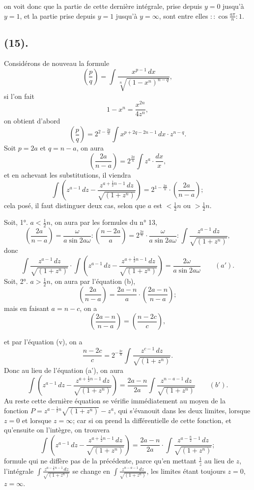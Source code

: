 \documentclass{article}
\begin{document}
on voit donc que la partie de cette dernière intégrale, prise depuis $y=0$ jusqu'à $y=1$, et la partie prise depuis $y=1$ jusqu'à $y=\infty$, sont entre elles $::\cos\frac{a\pi}{n}:1$.

\subsection*{(15).}

Considérons de nouveau la formule
\[ \left(\frac{p}{q}\right)=\int\frac{x^{p-1}\,dx}{\sqrt[n]{(1-x^{n})^{n-q}}}, \]
si l'on fait
\[ 1-x^{n}=\frac{x^{2n}}{4z^{n}}, \]
on obtient d'abord
\[ \left(\frac{p}{q}\right)=2^{2-\frac{2q}{n}}\int x^{p+2q-2n-1}\,dx\cdot z^{n-q}. \]
Soit $p=2a$ et $q=n-a$, on aura
\[ \left(\frac{2a}{n-a}\right)=2^{\frac{2a}{n}}\int z^{a}\cdot\frac{dx}{x}, \]
et en achevant les substitutions, il viendra
\[ \int\left(z^{a-1}\,dz-\frac{z^{a+\frac{1}{2}n-1}\,dz}{\sqrt{(1+z^{n})}}\right)=2^{1-\frac{2a}{n}}\cdot\left(\frac{2a}{n-a}\right); \]
cela posé, il faut distinguer deux cas, selon que $a$ est $<\frac{1}{2}n$ ou $>\frac{1}{2}n$.

Soit, 1°. $a<\frac{1}{2}n$, on aura par les formules du n° 13,
\[ \left(\frac{2a}{n-a}\right)=\frac{\omega}{a\sin 2a\omega}:\left(\frac{n-2a}{a}\right)=2^{\frac{2a}{n}}\cdot\frac{\omega}{a\sin 2a\omega}:\int\frac{z^{a-1}\,dz}{\sqrt{(1+z^{n})}}, \]
donc
\[ \int\frac{z^{a-1}\,dz}{\sqrt{(1+z^{n})}}\cdot\int\left(z^{a-1}\,dz-\frac{z^{a+\frac{1}{2}n-1}\,dz}{\sqrt{(1+z^{n})}}\right)=\frac{2\omega}{a\sin 2a\omega}\qquad(a'). \]
Soit, 2°. $a>\frac{1}{2}n$, on aura par l'équation (b),
\[ \left(\frac{2a}{n-a}\right)=\frac{2a-n}{a}\cdot\left(\frac{2a-n}{n-a}\right); \]
mais en faisant $a=n-c$, on a
\[ \left(\frac{2a-n}{n-a}\right)=\left(\frac{n-2c}{c}\right), \]

et par l'équation (v), on a
\[ \frac{n-2c}{c}=2^{-\frac{2c}{n}}\int\frac{z^{c-1}\,dz}{\sqrt{(1+z^{n})}}. \]
Donc au lieu de l'équation (a'), on aura
\[ \int\left(z^{a-1}\,dz-\frac{z^{a+\frac{1}{2}n-1}\,dz}{\sqrt{(1+z^{n})}}\right)=\frac{2a-n}{2a}\int\frac{z^{n-a-1}\,dz}{\sqrt{(1+z^{n})}}\qquad(b'). \]
Au reste cette dernière équation se vérifie immédiatement au moyen de la fonction $P=z^{a-\frac{1}{2}n}\sqrt{(1+z^{n})}-z^{a}$, qui s'évanouit dans les deux limites, lorsque $z=0$ et lorsque $z=\infty$; car si on prend la différentielle de cette fonction, et qu'ensuite on l'intègre, on trouvera
\[ \int\left(z^{a-1}\,dz-\frac{z^{a+\frac{1}{2}n-1}\,dz}{\sqrt{(1+z^{n})}}\right)=\frac{2a-n}{2a}\cdot\int\frac{z^{a-\frac{n}{2}-1}\,dz}{\sqrt{(1+z^{n})}}; \]
formule qui ne diffère pas de la précédente, parce qu'en mettant $\frac{1}{z}$ au lieu de $z$, l'intégrale $\displaystyle\int\frac{z^{a-\frac{1}{2}n-1}\,dz}{\sqrt{(1+z^{n})}}$ se change en $\displaystyle\int\frac{z^{n-a-1}\,dz}{\sqrt{(1+z^{n})}}$, les limites étant toujours $z=0$, $z=\infty$.
\end{document}

